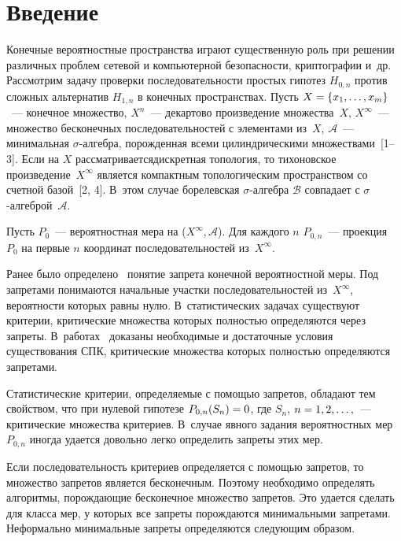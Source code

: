       \begin{multicols}{2}

            \label{st\stat}

\section{Введение}

  Конечные вероятностные пространства играют существенную роль при 
решении различных проблем сетевой и компьютерной безопасности, 
криптографии и~др. Рассмотрим задачу проверки последовательности простых 
гипотез $H_{0,n}$ против сложных альтернатив $H_{1,n}$ в конечных 
пространствах. Пусть $X\hm = \{x_1, \ldots ,x_m\}$~--- конечное множество, 
$X^n$~--- декартово произведение множества~$X$,\linebreak
 $X^\infty$~--- множество 
бесконечных последователь\-ностей с элементами из~$X$, $\mathcal{A}$~--- 
минимальная $\sigma$-ал\-гебра, порожденная всеми цилиндрическими 
множествами~[1--3]. Если на $X$ рассматривается\linebreak дискретная топология, то 
тихоновское произведение~$X^\infty$ является компактным топологическим 
пространством со счетной базой~[2, 4]. В~этом случае борелевская 
  $\sigma$-ал\-геб\-ра $\mathcal{B}$ совпадает с $\sigma$-ал\-геб\-рой~$\mathcal{A}$. 
  
  Пусть $P_0$~--- вероятностная мера на ($X^\infty,\mathcal{A}$). Для каждого 
$n$ $P_{0,n}$~--- проекция~$P_0$ на первые $n$ координат 
последовательностей из~$X^\infty$.
  
  Ранее было определено~\cite{5-gr, 6-gr} понятие запрета конечной 
вероятностной меры. Под запретами понимаются начальные участки 
последовательностей из~$X^\infty$, вероятности которых равны нулю. 
В~статистических задачах существуют критерии, критические множества 
которых полностью определяются через запреты. В~работах~\cite{5-gr, 6-gr} 
доказаны необходимые и достаточные условия существования СПК, критические множества которых 
полностью определяются запретами. 
  
  Статистические критерии, определяемые с помощью запретов, обладают тем 
свойством, что при нулевой гипотезе $P_{0,n}(S_n)\hm=0$, где $S_n$, $n\hm=1, 
2,\ldots,$~--- критические множества критериев. В~случае явного задания 
вероятностных мер $P_{0,n}$ иногда удается довольно легко определить 
запреты этих мер. 
  
  Если последовательность критериев определяется с помощью запретов, то 
множество запретов является бесконечным. Поэтому необходимо определять 
алгоритмы, порождающие бесконечное множество запретов. Это удается 
сделать для класса мер, у которых все запреты порождаются минимальными 
запретами. Неформально минимальные запреты определяются следующим 
образом. 
  

\end{multicols}
